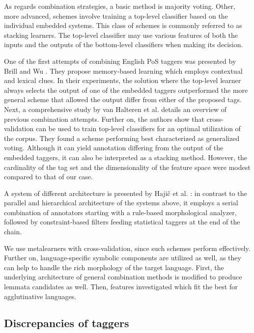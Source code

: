As regards combination strategies, a basic method is majority voting.
Other, more advanced, schemes involve training a top-level classifier based on the individual embedded systems.
This class of schemes is commonly referred to as stacking learners.
The top-level classifier may use various features of both the inputs and the outputs of the bottom-level classifiers when making its decision. 

One of the first attempts of combining English PoS taggers was presented by Brill and Wu \cite{Brill1998}.
They propose memory-based learning which employs contextual and lexical clues.
In their experiments, the solution where the top-level learner always selects the output of one of the embedded taggers outperformed the more general scheme that allowed the output differ from either of the proposed tags.
Next, a comprehensive study by van Halteren et al. \cite{Halteren2001} details an overview of previous combination attempts.
Further on, the authors show that cross-validation can be used to train top-level classifiers for an optimal utilization of the corpus.
They found a scheme performing best characterized as generalized voting.
Although it can yield annotation differing from the output of the embedded taggers, it can also be interpreted as a stacking method.
However, the cardinality of the tag set and the dimensionality of the feature space were modest compared to that of our case.

A system of different architecture is presented by Hajič et al. \cite{Hajic2001}: in contrast to the parallel and hierarchical architecture of the systems above, it employs a serial combination of annotators starting with a rule-based morphological analyzer, followed by constraint-based filters feeding statistical taggers at the end of the chain. 

We use metalearners with cross-validation, since such schemes \cite{Brill1998,Halteren2001} perform effectively.
Further on, language-specific symbolic components are utilized as well, as they can help to handle the rich morphology of the target language.
First, the underlying architecture of general combination methods is modified to produce lemmata candidates as well.
Then, features investigated which fit the best for agglutinative languages.

\subsection{Discrepancies of taggers}

